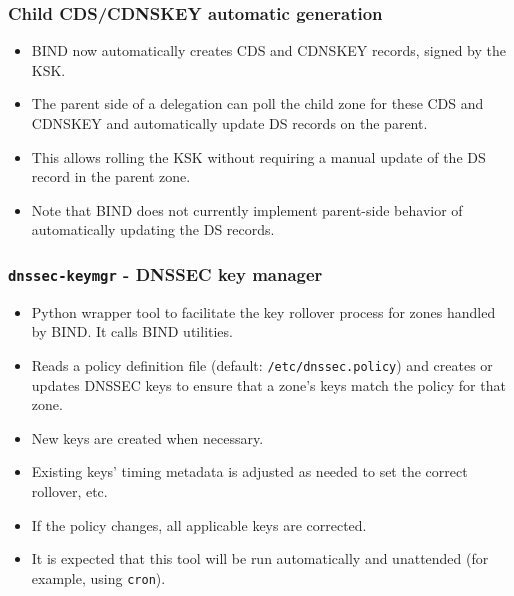 \documentclass[aspectratio=169,14pt]{beamer}
\begin{document}
\frame
{
  \frametitle{Child CDS/CDNSKEY automatic generation}

  \begin{itemize}

  \item BIND now automatically creates CDS and CDNSKEY records, signed
    by the KSK.

  \item The parent side of a delegation can poll the child zone for
    these CDS and CDNSKEY and automatically update DS records on the
    parent.

  \item This allows rolling the KSK without requiring a manual update of
    the DS record in the parent zone.

  \item Note that BIND does not currently implement parent-side behavior
    of automatically updating the DS records.

  \end{itemize}
}

\frame
{
  \frametitle{\texttt{dnssec-keymgr} - DNSSEC key manager}

  \begin{itemize}

  \item Python wrapper tool to facilitate the key rollover process for
    zones handled by BIND. It calls BIND utilities.

  \item Reads a policy definition file (default:
    \texttt{/etc/dnssec.policy}) and creates or updates DNSSEC keys to
    ensure that a zone's keys match the policy for that zone.

  \item New keys are created when necessary.

  \item Existing keys' timing metadata is adjusted as needed to set the
    correct rollover, etc.

  \item If the policy changes, all applicable keys are corrected.

  \item It is expected that this tool will be run automatically and
    unattended (for example, using \texttt{cron}).

  \end{itemize}
}
\end{document}
